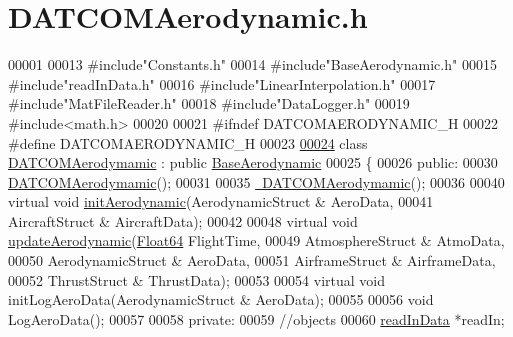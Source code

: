 \hypertarget{_d_a_t_c_o_m_aerodynamic_8h_source}{}\section{D\+A\+T\+C\+O\+M\+Aerodynamic.\+h}
\label{_d_a_t_c_o_m_aerodynamic_8h_source}

\begin{DoxyCode}
00001 
00013 \textcolor{preprocessor}{#include"Constants.h"}
00014 \textcolor{preprocessor}{#include"BaseAerodynamic.h"}
00015 \textcolor{preprocessor}{#include"readInData.h"}
00016 \textcolor{preprocessor}{#include"LinearInterpolation.h"}
00017 \textcolor{preprocessor}{#include"MatFileReader.h"}
00018 \textcolor{preprocessor}{#include"DataLogger.h"}
00019 \textcolor{preprocessor}{#include<math.h>}
00020 
00021 \textcolor{preprocessor}{#ifndef DATCOMAERODYNAMIC\_H}
00022 \textcolor{preprocessor}{#define DATCOMAERODYNAMIC\_H}
00023 
\hyperlink{group___aerodynamic}{00024} \textcolor{keyword}{class }\hyperlink{group___aerodynamic_class_d_a_t_c_o_m_aerodymamic}{DATCOMAerodymamic} : \textcolor{keyword}{public} \hyperlink{group___aerodynamic_class_base_aerodynamic}{BaseAerodynamic}
00025 \{
00026 \textcolor{keyword}{public}:
00030     \hyperlink{group___aerodynamic_a03d01a72cf389483e03e2bf6cce33299}{DATCOMAerodymamic}();
00031 
00035     \hyperlink{group___aerodynamic_a3619e38867cad4b0c8b06a939281a74e}{~DATCOMAerodymamic}();
00036 
00040     \textcolor{keyword}{virtual} \textcolor{keywordtype}{void} \hyperlink{group___aerodynamic_ab2d6d5df8505f3b1f1b8d74be820ca34}{initAerodynamic}(AerodynamicStruct & AeroData, 
00041                                AircraftStruct & AircraftData);
00042 
00048     \textcolor{keyword}{virtual} \textcolor{keywordtype}{void} \hyperlink{group___aerodynamic_a589f8dbf43ca52f47581ca9caa53af8e}{updateAerodynamic}(\hyperlink{group___tools_ga3f1431cb9f76da10f59246d1d743dc2c}{Float64} FlightTime,
00049                         AtmosphereStruct & AtmoData,
00050                         AerodynamicStruct & AeroData,
00051                         AirframeStruct & AirframeData,
00052                         ThrustStruct & ThrustData);
00053 
00054     \textcolor{keyword}{virtual} \textcolor{keywordtype}{void} initLogAeroData(AerodynamicStruct & AeroData);
00055 
00056     \textcolor{keywordtype}{void} LogAeroData();
00057 
00058 \textcolor{keyword}{private}:
00059     \textcolor{comment}{//objects}
00060     \hyperlink{classread_in_data}{readInData} *readIn;

\end{DoxyCode}
